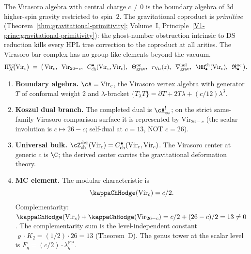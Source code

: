 \begin{computation}
\label{comp:platonic-gravity}
The Virasoro algebra with central charge $c \ne 0$ is the
boundary algebra of 3d higher-spin gravity restricted to
spin~$2$. The gravitational coproduct
is \emph{primitive}
(Theorem~\ref{thm:gravitational-primitivity};
Volume~I, Principle~\ref*{V1-princ:gravitational-primitivity}):
the ghost-number obstruction intrinsic to DS reduction kills
every HPL tree correction to the coproduct at all arities.
The Virasoro bar complex has no group-like elements beyond
the vacuum.
\begin{equation}\label{eq:platonic-Vir}
\Pi^{\mathrm{oc}}_X\!\bigl(\mathrm{Vir}_c\bigr)
\;=\;
\bigl(\,
\mathrm{Vir}_c,\;\;
\mathrm{Vir}_{26-c},\;\;
C^\bullet_{\mathrm{ch}}(\mathrm{Vir}_c, \mathrm{Vir}_c),\;\;
\Theta^{\mathrm{oc}}_{\mathrm{grav}},\;\;
r_{\mathrm{Vir}}(z),\;\;
\nabla^{\mathrm{hol}}_{\mathrm{grav}},\;\;
\HH^{\mathrm{ch}}_\bullet(\mathrm{Vir}_c),\;\;
\mathfrak{R}^{\mathrm{oc}}_\bullet
\,\bigr).
\end{equation}
\begin{enumerate}[label=\textup{(\roman*)},nosep]
\item \textbf{Boundary algebra.}
 $\cA = \mathrm{Vir}_c$, the Virasoro vertex algebra with
 generator $T$ of conformal weight $2$ and $\lambda$-bracket
 $\{T_\lambda T\} = \partial T + 2T\lambda + (c/12)\lambda^3$.

\item \textbf{Koszul dual branch.}
 The completed dual is $\cA^!_\infty$; on the strict same-family
 Virasoro comparison surface it is represented by
 $\mathrm{Vir}_{26-c}$
 \textup{(}the scalar involution is $c \mapsto 26 - c$;
 self-dual at $c = 13$, NOT $c = 26$\textup{)}.

\item \textbf{Universal bulk.}
 $\cZ^{\mathrm{der}}_{\mathrm{ch}}(\mathrm{Vir}_c)
 = C^\bullet_{\mathrm{ch}}(\mathrm{Vir}_c, \mathrm{Vir}_c)$.
 The Virasoro center at generic $c$ is $\C$; the derived center
 carries the gravitational deformation theory.

\item \textbf{MC element.}
 The modular characteristic is
 \begin{equation}\label{eq:platonic-kappa-Vir}
 \kappaChHodge(\mathrm{Vir}_c) = c/2.
 \end{equation}
 Complementarity:
 $\kappaChHodge(\mathrm{Vir}_c) + \kappaChHodge(\mathrm{Vir}_{26-c})
 = c/2 + (26-c)/2 = 13 \ne 0$.
 The complementarity sum is the level-independent constant
 $\varrho \cdot K_2 = (1/2) \cdot 26 = 13$
 \textup{(}Theorem~\textup{D}\textup{)}.
 The genus tower at the scalar level is $F_g = (c/2) \cdot \lambda_g^{\mathrm{FP}}$.


\end{enumerate}
\end{computation}
